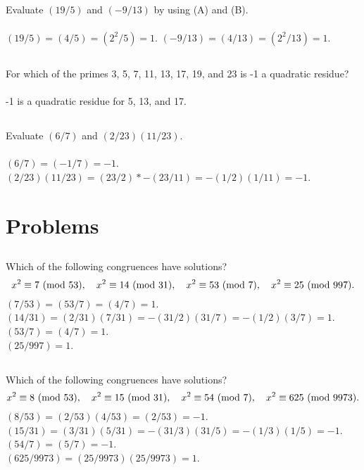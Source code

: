\documentclass{article} \usepackage{amsmath}
\begin{document}
\subsection{}
Evaluate $(19/5)$ and $(-9/13)$ by using (A) and (B).\\~\\
$(19/5) = (4/5) = (2^2/5) = 1$.
$(-9/13) = (4/13) = (2^2/13) = 1$.

\subsection{}
For which of the primes 3, 5, 7, 11, 13, 17, 19, and 23
is -1 a quadratic residue?\\~\\
-1 is a quadratic residue for 5, 13, and 17.

\subsection{}
Evaluate $(6/7)$ and $(2/23)(11/23)$.\\~\\
$(6/7) = (-1/7) = -1$.
$(2/23)(11/23) = (23/2)*-(23/11) = -(1/2)(1/11) = -1$.

\section{Problems}

\subsection{}
Which of the following congruences have solutions?
\begin{equation*}
    x^2 \equiv 7 \ (\mathrm{mod}\ 53),\quad
    x^2 \equiv 14 \ (\mathrm{mod}\ 31),\quad
    x^2 \equiv 53 \ (\mathrm{mod}\ 7),\quad
    x^2 \equiv 25 \ (\mathrm{mod}\ 997).
\end{equation*}
$(7/53) = (53/7) = (4/7) = 1$.\\
$(14/31) = (2/31)(7/31) = -(31/2)(31/7) = -(1/2)(3/7) = 1$.\\
$(53/7) = (4/7) = 1$.\\
$(25/997) = 1$.\\

\subsection{}
Which of the following congruences have solutions?
\begin{equation*}
    x^2 \equiv 8 \ (\mathrm{mod}\ 53),\quad
    x^2 \equiv 15 \ (\mathrm{mod}\ 31),\quad
    x^2 \equiv 54 \ (\mathrm{mod}\ 7),\quad
    x^2 \equiv 625 \ (\mathrm{mod}\ 9973).
\end{equation*}
$(8/53) = (2/53)(4/53) = (2/53) = -1$.\\
$(15/31) = (3/31)(5/31) = -(31/3)(31/5) = -(1/3)(1/5) = -1$.\\
$(54/7) = (5/7) = -1$.\\
$(625/9973) = (25/9973)(25/9973) = 1$.\\
\end{document}
